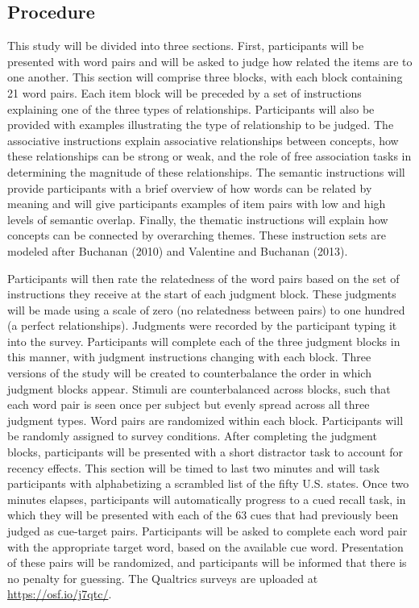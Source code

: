 \documentclass[english,man]{apa6}
\theoremstyle{definition}
\theoremstyle{definition}
\theoremstyle{definition}
\theoremstyle{remark}
\begin{document}
\subsection{Procedure}\label{procedure}

This study will be divided into three sections. First, participants will
be presented with word pairs and will be asked to judge how related the
items are to one another. This section will comprise three blocks, with
each block containing 21 word pairs. Each item block will be preceded by
a set of instructions explaining one of the three types of
relationships. Participants will also be provided with examples
illustrating the type of relationship to be judged. The associative
instructions explain associative relationships between concepts, how
these relationships can be strong or weak, and the role of free
association tasks in determining the magnitude of these relationships.
The semantic instructions will provide participants with a brief
overview of how words can be related by meaning and will give
participants examples of item pairs with low and high levels of semantic
overlap. Finally, the thematic instructions will explain how concepts
can be connected by overarching themes. These instruction sets are
modeled after Buchanan (2010) and Valentine and Buchanan (2013).

Participants will then rate the relatedness of the word pairs based on
the set of instructions they receive at the start of each judgment
block. These judgments will be made using a scale of zero (no
relatedness between pairs) to one hundred (a perfect relationships).
Judgments were recorded by the participant typing it into the survey.
Participants will complete each of the three judgment blocks in this
manner, with judgment instructions changing with each block. Three
versions of the study will be created to counterbalance the order in
which judgment blocks appear. Stimuli are counterbalanced across blocks,
such that each word pair is seen once per subject but evenly spread
across all three judgment types. Word pairs are randomized within each
block. Participants will be randomly assigned to survey conditions.
After completing the judgment blocks, participants will be presented
with a short distractor task to account for recency effects. This
section will be timed to last two minutes and will task participants
with alphabetizing a scrambled list of the fifty U.S. states. Once two
minutes elapses, participants will automatically progress to a cued
recall task, in which they will be presented with each of the 63 cues
that had previously been judged as cue-target pairs. Participants will
be asked to complete each word pair with the appropriate target word,
based on the available cue word. Presentation of these pairs will be
randomized, and participants will be informed that there is no penalty
for guessing. The Qualtrics surveys are uploaded at
\url{https://osf.io/j7qtc/}.
\end{document}
